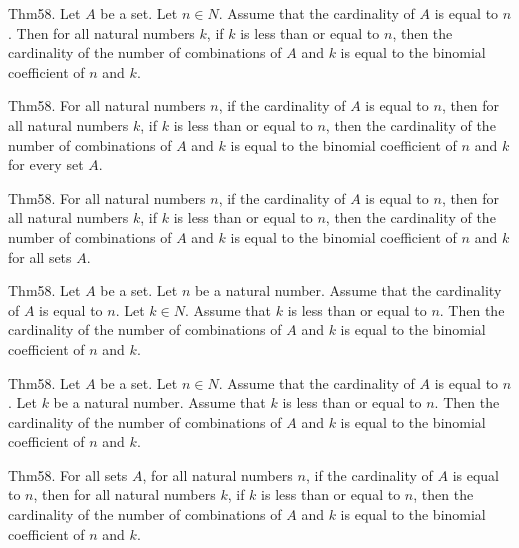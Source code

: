 \documentclass{article}
\begin{document}
Thm58. Let $A$ be a set. Let $n \in N$. Assume that the cardinality of $A$ is equal to $n$. Then for all natural numbers $k$, if $k$ is less than or equal to $n$, then the cardinality of the number of combinations of $A$ and $k$ is equal to the binomial coefficient of $n$ and $k$.

Thm58. For all natural numbers $n$, if the cardinality of $A$ is equal to $n$, then for all natural numbers $k$, if $k$ is less than or equal to $n$, then the cardinality of the number of combinations of $A$ and $k$ is equal to the binomial coefficient of $n$ and $k$ for every set $A$.

Thm58. For all natural numbers $n$, if the cardinality of $A$ is equal to $n$, then for all natural numbers $k$, if $k$ is less than or equal to $n$, then the cardinality of the number of combinations of $A$ and $k$ is equal to the binomial coefficient of $n$ and $k$ for all sets $A$.

Thm58. Let $A$ be a set. Let $n$ be a natural number. Assume that the cardinality of $A$ is equal to $n$. Let $k \in N$. Assume that $k$ is less than or equal to $n$. Then the cardinality of the number of combinations of $A$ and $k$ is equal to the binomial coefficient of $n$ and $k$.

Thm58. Let $A$ be a set. Let $n \in N$. Assume that the cardinality of $A$ is equal to $n$. Let $k$ be a natural number. Assume that $k$ is less than or equal to $n$. Then the cardinality of the number of combinations of $A$ and $k$ is equal to the binomial coefficient of $n$ and $k$.

Thm58. For all sets $A$, for all natural numbers $n$, if the cardinality of $A$ is equal to $n$, then for all natural numbers $k$, if $k$ is less than or equal to $n$, then the cardinality of the number of combinations of $A$ and $k$ is equal to the binomial coefficient of $n$ and $k$.
\end{document}
